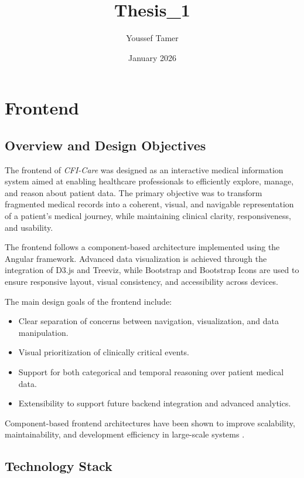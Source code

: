 \documentclass{article}
\title{Thesis_1}
\author{Youssef Tamer}
\date{January 2026}
\begin{document}
\section{Frontend}\label{chap:Frontend}

\subsection{Overview and Design Objectives}

The frontend of \textit{CFI-Care} was designed as an interactive medical
information system aimed at enabling healthcare professionals to efficiently
explore, manage, and reason about patient data. The primary objective was to
transform fragmented medical records into a coherent, visual, and navigable
representation of a patient’s medical journey, while maintaining clinical
clarity, responsiveness, and usability.

The frontend follows a component-based architecture implemented using the
Angular framework. Advanced data visualization is achieved through the
integration of D3.js and Treeviz, while Bootstrap and Bootstrap Icons are used
to ensure responsive layout, visual consistency, and accessibility across
devices.

The main design goals of the frontend include:
\begin{itemize}
    \item Clear separation of concerns between navigation, visualization, and data
          manipulation.
    \item Visual prioritization of clinically critical events.
    \item Support for both categorical and temporal reasoning over patient medical data.
    \item Extensibility to support future backend integration and advanced analytics.
\end{itemize}

Component-based frontend architectures have been shown to improve scalability,
maintainability, and development efficiency in large-scale systems
\cite{componentFrontEnd2021,componentFrontEnd2021}.

\subsection{Technology Stack}
\end{document}
